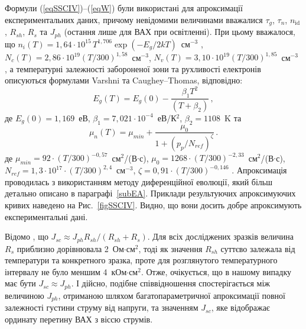 Формули (\ref{eqSSCIV})--(\ref{eqW}) були використані для апроксимації експериментальних даних, причому
невідомими величинами вважалися $\tau_g$, $\tau_n$, $n_{\mathrm{id}}$, $R_{sh}$, $R_s$ та  $J_{ph}$ (остання лише для ВАХ при освітленні).
При цьому вважалося, що
$n_i(T)=1,64\cdot10^{15}\,T^{1,706}\exp(-E_g/2kT)$~см$^{-3}$ \cite{ni:Green}, $N_c(T)=2,86\cdot10^{19}(T/300)^{1,58}$~см$^{-3}$, $N_v(T)=3,10\cdot10^{19}(T/300)^{1,85}$~см$^{-3}$
\cite{Nc:Green},
а температурні залежності забороненої зони та рухливості електронів описуються формулами Varshni та Caughey--Thomas, відповідно:
\begin{equation}
\label{eqEg}
 E_g(T) = E_g(0) - \frac{\beta_1 T^2}{(T + \beta_2)}\,,
\end{equation}
де
$E_g(0)=1,169$~еВ,
$\beta_1=7,021\cdot10^{-4}$~еВ/К$^2$,
$\beta_2=1108$~K \cite{Schroder2006,Markvart} та
\begin{equation}
\label{eqMu}
\mu_n(T) = \mu_{min}+\frac{\mu_0}{1+(p_p/N_{ref})^{\zeta}}\,.
\end{equation}
де
$\mu_{min}=92\cdot(T/300)^{-0,57}$~см$^2$/(В$\cdot$с),
$\mu_0=1268\cdot(T/300)^{-2,33}$~см$^2$/(В$\cdot$с),
$N_{ref}=1,3\cdot10^{17}\cdot(T/300)^{2,4}$~см$^{-3}$,
$\zeta=0,91\cdot(T/300)^{-0,146}$ \cite[с.~505, Table~A8.2]{Schroder2006}.
Апроксимація проводилась з використанням методу диференційної еволюції\cite{DE:Sun,DEWang,DEModif}, який більш детально описано в параграфі~\ref{subEA}.
Приклади результуючих апроксимуючих кривих наведено  на Рис.~\ref{figSSCIV}.
Видно, що вони досить добре апроксимують експериментальні дані.

Відомо \cite{2Diod:Buhler}, що $J_{sc}\approx J_{ph}R_{sh}/(R_{sh}+R_{s})$.
Для всіх досліджених зразків величина $R_s$ приблизно дорівнювала 2~Ом$\cdot$см$^2$, тоді як значення $R_{sh}$ суттєво залежала від температури та конкретного зразка, проте для
розглянутого температурного інтервалу не було меншим  4~кОм$\cdot$см$^2$.
Отже, очікується, що в нашому випадку має бути $J_{sc}\approx J_{ph}$.
І дійсно, подібне співвідношення спостерігається між величиною $J_{ph}$, отриманою шляхом багатопараметричної апроксимації
повної залежності густини струму від напруги, та значенням $J_{sc}$, яке відображає ординату перетину ВАХ з віссю струмів.

